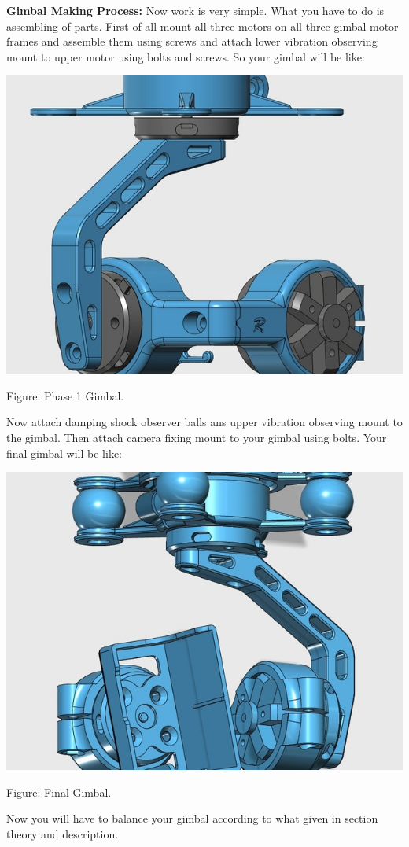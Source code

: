 \documentclass[11pt,a4paper]{article}
\begin{document}
		\textbf{Gimbal Making Process:}
		\newline
		Now work is very simple. What you have to do is assembling of parts. First of all mount all three motors on all three gimbal motor frames and assemble them using screws and attach lower vibration observing mount to upper motor using bolts and screws. So your gimbal will be like:
		\begin{center}
			\includegraphics[scale=0.5]{gimbal_making_phase_1.jpg}
		\end{center}
		\begin{center}
			Figure: Phase 1 Gimbal.
		\end{center}
		Now attach damping shock observer balls ans upper vibration observing mount to the gimbal. Then attach camera fixing mount to your gimbal using bolts. Your final gimbal will be like:
		\begin{center}
			\includegraphics[scale=0.5]{Final_Gimbal.jpg}
		\end{center}
		\begin{center}
			Figure: Final Gimbal.
		\end{center}
		Now you will have to balance your gimbal according to what given in section theory and description.
\end{document}
